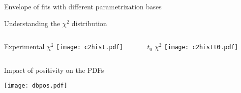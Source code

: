 \begin{frame}{Envelope of fits with different parametrization bases}
\end{frame}


\begin{frame}{Understanding the $\chi^2$ distribution}
    \begin{columns}
        \begin{column}[T]{0.48\textwidth}
            \centering
            Experimental $\chi^2$
            \texttt{[image: c2hist.pdf]}
        \end{column}
        \begin{column}[T]{0.48\textwidth}
            \centering
            $t_0$ $\chi^2$
            \texttt{[image: c2histt0.pdf]}
        \end{column}
    \end{columns}
\end{frame}


\begin{frame}[t]{Impact of positivity on the PDFs}
    \begin{center}
        \texttt{[image: dbpos.pdf]}
    \end{center}
\end{frame}



